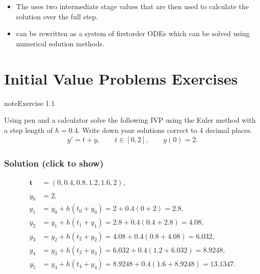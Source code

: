 \documentclass[letterpaper,10pt,english]{jupyterBook}
\begin{document}
\begin{itemize}
\item {} 
\sphinxAtStartPar
The {\hyperref[\detokenize{1_IVPs/1.4_RK2:rk2-definition}]{}} uses two intermediate stage values that are then used to calculate the solution over the full step.

\item {} 
\sphinxAtStartPar
{\hyperref[\detokenize{1_IVPs/1.5_Higher_Order_ODEs:higher-order-odes-section}]{}} can be rewritten as a system of first\sphinxhyphen{}order ODEs which can be solved using numerical solution methods.

\end{itemize}

\sphinxstepscope


\section{Initial Value Problems Exercises}
\label{\detokenize{1_IVPs/1.7_Exercises:initial-value-problems-exercises}}\label{\detokenize{1_IVPs/1.7_Exercises::doc}}
\begin{sphinxadmonition}{note}{Exercise 1.1}

\sphinxAtStartPar
Using pen and a calculator solve the following IVP using the Euler method with a step length of \(h=0.4\). Write down your solutions correct to 4 decimal places.
\begin{align*}
    y' =t + y, \qquad t\in [0,2],\qquad y(0)=2.
\end{align*}\subsubsection*{Solution (click to show)}
\begin{align*}
    \mathbf{t} &= (0, 0.4, 0.8, 1.2, 1.6, 2), \\
    \\
    y_0 &= 2, \\
    y_1 &= y_0 + h(t_0 + y_0) = 2 + 0.4(0 + 2) = 2.8, \\
    y_2 &= y_1 + h(t_1 + y_1) = 2.8 + 0.4(0.4 + 2.8) = 4.08, \\
    y_3 &= y_2 + h(t_2 + y_2) = 4.08 + 0.4(0.8 + 4.08) = 6.032, \\
    y_4 &= y_3 + h(t_3 + y_3) = 6.032 + 0.4(1.2 + 6.032) = 8.9248, \\
    y_5 &= y_4 + h(t_4 + y_4) = 8.9248 + 0.4(1.6 + 8.9248) = 13.1347.
\end{align*}\end{sphinxadmonition}
\end{document}
